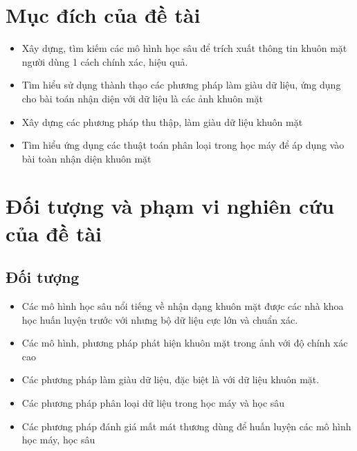 
\section{Mục đích của đề tài}

\begin{itemize}
      \item Xây dựng, tìm kiếm các mô hình học sâu để trích xuất thông tin khuôn mặt
            người dùng 1 cách chính xác, hiệu quả.
      \item Tìm hiểu sử dụng thành thạo các phương pháp làm giàu dữ liệu,
            ứng dụng cho bài toán nhận diện với dữ liệu là các ảnh khuôn mặt
      \item Xây dựng các phương pháp thu thập, làm giàu dữ liệu khuôn mặt
      \item Tìm hiểu ứng dụng các thuật toán phân loại trong học máy để
            áp dụng vào bài toàn nhận diện khuôn mặt
\end{itemize}

\section{Đối tượng và phạm vi nghiên cứu của đề tài}
\subsection{Đối tượng}
\begin{itemize}
      \item Các mô hình học sâu nổi tiếng về nhận dạng khuôn mặt được các nhà khoa học huấn luyện trước với nhưng bộ dữ liệu
            cực lớn và chuẩn xác.
      \item Các mô hình, phương pháp phát hiện khuôn mặt trong ảnh với độ chính xác cao
      \item Các phương pháp làm giàu dữ liệu, đặc biệt là với dữ liệu khuôn mặt.
      \item Các phương pháp phân loại dữ liệu trong học máy và học sâu
      \item Các phương pháp đánh giá mất mát thương dùng để huấn luyện các mô hình học máy, học sâu
\end{itemize}
\newpage
